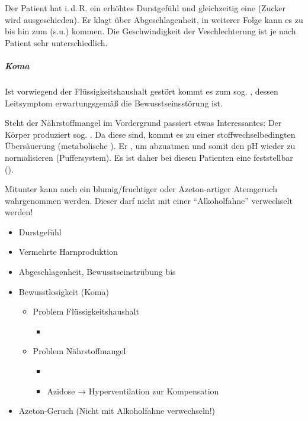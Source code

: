 {%
Der Patient hat i.\,d.\,R. ein erhöhtes Durstgefühl und
gleichzeitig eine  (Zucker wird
ausgeschieden). Er klagt über Abgeschlagenheit, in weiterer
Folge kann es zu  bis hin zum
 (s.u.) kommen. Die Geschwindigkeit der
Veschlechterung ist je nach Patient sehr unterschiedlich.

\subparagraph{Koma} 
\label{topic:koma-diabetisches}
\label{topic:diabetisches-koma}


Ist vorwiegend der Flüssigkeitshaushalt gestört kommt es zum
sog. , dessen Leitsymptom
erwartungsgemäß die Bewusstseinsstörung ist.

Steht der Nährstoffmangel im Vordergrund passiert etwas
Interessantes: Der Körper produziert sog. . Da
diese  sind, kommt es zu einer stoffwechselbedingten
Übersäuerung (metabolische 
). 
Er , um  abzuatmen und somit
den pH wieder zu normalisieren (Puffersystem). Es ist daher
bei diesen Patienten eine 
feststellbar ().

Mitunter kann auch ein blumig/fruchtiger oder Azeton-artiger
Atemgeruch wahrgenommen werden. Dieser darf nicht mit einer
\enquote{Alkoholfahne} verwechselt werden!
}{
\begin{itemize}
  \item Durstgefühl
  \item Vermehrte Harnproduktion
  \item Abgeschlagenheit, Bewusstseinstrübung bis
  \item Bewusstlosigkeit (Koma)
  \begin{itemize}
    \item Problem Flüssigkeitshaushalt
    \begin{itemize}
      \item {}
    \end{itemize}
    \item Problem Nährstoffmangel
    \begin{itemize}
      \item {}
      \item Azidose → Hyperventilation zur Kompensation
    \end{itemize}
  \end{itemize}
  \item Azeton-Geruch (Nicht mit Alkoholfahne verwechseln!)
\end{itemize}
}{}{}{}


